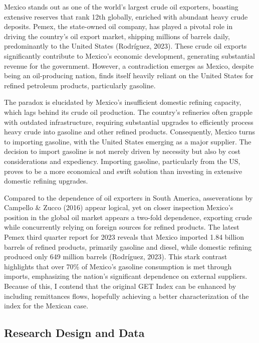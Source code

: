 \documentclass[
]{article}
\begin{document}
Mexico stands out as one of the world's largest crude oil exporters,
boasting extensive reserves that rank 12th globally, enriched with
abundant heavy crude deposits. Pemex, the state-owned oil company, has
played a pivotal role in driving the country's oil export market,
shipping millions of barrels daily, predominantly to the United States
(Rodríguez, 2023). These crude oil exports significantly contribute to
Mexico's economic development, generating substantial revenue for the
government. However, a contradiction emerges as Mexico, despite being an
oil-producing nation, finds itself heavily reliant on the United States
for refined petroleum products, particularly gasoline.

The paradox is elucidated by Mexico's insufficient domestic refining
capacity, which lags behind its crude oil production. The country's
refineries often grapple with outdated infrastructure, requiring
substantial upgrades to efficiently process heavy crude into gasoline
and other refined products. Consequently, Mexico turns to importing
gasoline, with the United States emerging as a major supplier. The
decision to import gasoline is not merely driven by necessity but also
by cost considerations and expediency. Importing gasoline, particularly
from the US, proves to be a more economical and swift solution than
investing in extensive domestic refining upgrades.

Compared to the dependence of oil exporters in South America,
asseverations by Campello \& Zucco (2016) appear logical, yet on closer
inspection Mexico's position in the global oil market appears a two-fold
dependence, exporting crude while concurrently relying on foreign
sources for refined products. The latest Pemex third quarter report for
2023 reveals that Mexico imported 1.84 billion barrels of refined
products, primarily gasoline and diesel, while domestic refining
produced only 649 million barrels (Rodríguez, 2023). This stark contrast
highlights that over 70\% of Mexico's gasoline consumption is met
through imports, emphasizing the nation's significant dependence on
external suppliers. Because of this, I contend that the original GET
Index can be enhanced by including remittances flows, hopefully
achieving a better characterization of the index for the Mexican case.

\hypertarget{research-design-and-data}{%
\subsection{Research Design and Data}\label{research-design-and-data}}
\end{document}
